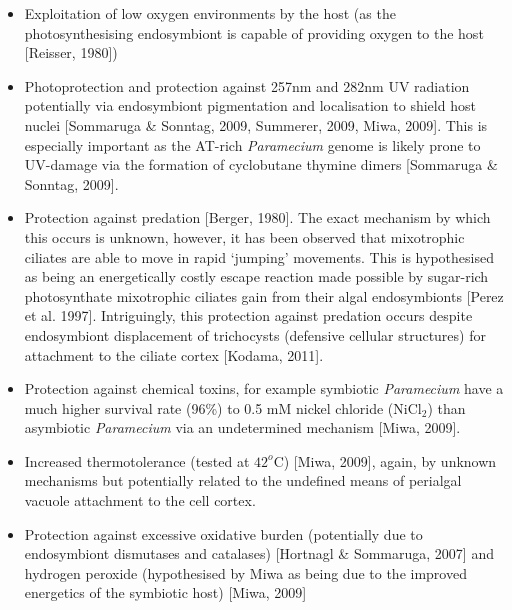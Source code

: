 \begin{itemize}
  \item Exploitation of low oxygen environments by the host (as the photosynthesising endosymbiont is capable of providing oxygen to the host [Reisser, 1980])
  \item Photoprotection and protection against 257nm and 282nm UV radiation potentially via endosymbiont pigmentation and localisation to shield host nuclei [Sommaruga \& Sonntag, 2009, Summerer, 2009, Miwa, 2009].  This is especially important as the AT-rich \textit{Paramecium} genome is likely prone to UV-damage via the formation of cyclobutane thymine dimers [Sommaruga \& Sonntag, 2009].
  \item Protection against predation [Berger, 1980]. The exact mechanism by which this occurs is unknown, however, it has been observed that mixotrophic ciliates are able to move in rapid `jumping' movements. This is hypothesised as being an energetically costly escape reaction made possible by sugar-rich photosynthate mixotrophic ciliates gain from their algal endosymbionts [Perez et al. 1997]. Intriguingly, this protection against predation occurs despite endosymbiont displacement of trichocysts (defensive cellular structures) for attachment to the ciliate cortex [Kodama, 2011].
  \item Protection against chemical toxins, for example symbiotic \textit{Paramecium} have a much higher survival rate (96\%) to 0.5 mM nickel chloride (NiCl$_{2}$) than asymbiotic \textit{Paramecium} via an undetermined mechanism [Miwa, 2009].
  \item Increased thermotolerance (tested at $42^{o}$C) [Miwa, 2009], again, by unknown mechanisms but potentially related to the undefined means of perialgal vacuole attachment to the cell cortex.
  \item Protection against excessive oxidative burden (potentially due to endosymbiont dismutases and catalases) [Hortnagl \& Sommaruga, 2007] and hydrogen peroxide (hypothesised by Miwa as being due to the improved energetics of the symbiotic host) [Miwa, 2009]
\end{itemize}

